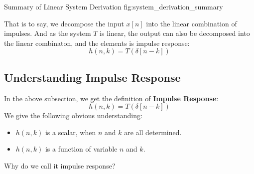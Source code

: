                 {Summary of Linear System Derivation}
                {fig:system_derivation_summary}

        That is to say, we decompose the input $x[n]$ into the linear combination of impulses.
        And as the system $T$ is linear, the output can also be decomposed into the linear combinaton, 
        and the elements is impulse response:
                    \begin{equation}
                        h(n,k) = T(\delta[n-k])
                    \end{equation} 
        
        \subsection{Understanding Impulse Response}
        In the above subsection, we get the definition of \textbf{Impulse Response}:
                    \begin{equation}
                        h(n,k) = T(\delta[n-k])
                    \end{equation}
        We give the following obvious understanding:
            \begin{itemize}
                \item $h(n,k)$ is a scalar, when $n$ and $k$ are all determined.
                \item $h(n,k)$ is a function of variable $n$ and $k$.
            \end{itemize}
        Why do we call it impulse response? 
        
